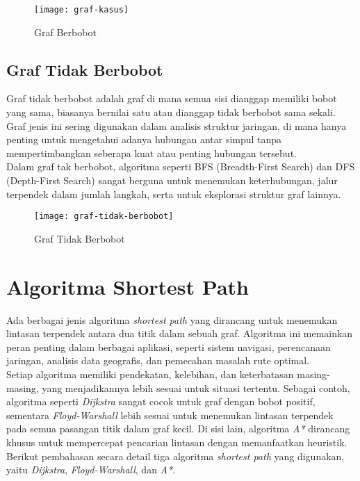 \begin{figure}[H] 
    \centering  
    \texttt{[image: graf-kasus]}  
    \caption{Graf Berbobot}
    \label{fig:grafberbobot} 
\end{figure}

\subsection{Graf Tidak Berbobot ~\cite{Diestel:17:graph}}
\label{sec:graftidakberbobot}
Graf tidak berbobot adalah graf di mana semua sisi dianggap memiliki bobot yang sama, biasanya bernilai satu atau dianggap tidak berbobot sama sekali. Graf jenis ini sering digunakan dalam analisis struktur jaringan, di mana hanya penting untuk mengetahui adanya hubungan antar simpul tanpa mempertimbangkan seberapa kuat atau penting hubungan tersebut.
\\
Dalam graf tak berbobot, algoritma seperti BFS (Breadth-First Search) dan DFS (Depth-First Search) sangat berguna untuk menemukan keterhubungan, jalur terpendek dalam jumlah langkah, serta untuk eksplorasi struktur graf lainnya.

\begin{figure}[H] 
    \centering  
    \texttt{[image: graf-tidak-berbobot]}  
    \caption{Graf Tidak Berbobot}
    \label{fig:graf} 
\end{figure}
\newpage
\section{Algoritma Shortest Path}
\label{sec:algoritmasp}
Ada berbagai jenis algoritma \textit{shortest path} yang dirancang untuk menemukan lintasan terpendek antara dua titik dalam sebuah graf. Algoritma ini memainkan peran penting dalam berbagai aplikasi, seperti sistem navigasi, perencanaan jaringan, analisis data geografis, dan pemecahan masalah rute optimal.
\\
Setiap algoritma memiliki pendekatan, kelebihan, dan keterbatasan masing-masing, yang menjadikannya lebih sesuai untuk situasi tertentu. Sebagai contoh, algoritma seperti \textit{Dijkstra} sangat cocok untuk graf dengan bobot positif, sementara \textit{Floyd-Warshall} lebih sesuai untuk menemukan lintasan terpendek pada semua pasangan titik dalam graf kecil. Di sisi lain, algoritma \textit{A*} dirancang khusus untuk mempercepat pencarian lintasan dengan memanfaatkan heuristik. Berikut pembahasan secara detail tiga algoritma \textit{shortest path} yang digunakan, yaitu \textit{Dijkstra}, \textit{Floyd-Warshall}, dan \textit{A*}.

